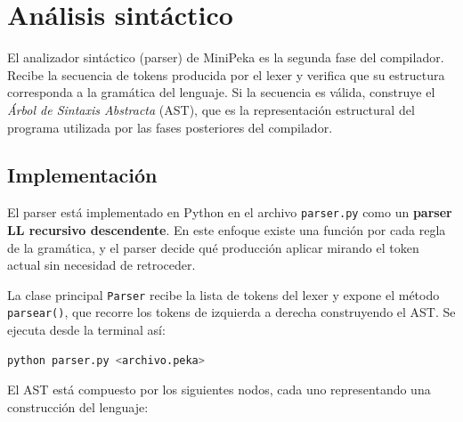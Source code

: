 \documentclass[12pt]{article}
\begin{document}
\section{Análisis sintáctico}

El analizador sintáctico (parser) de MiniPeka es la segunda fase del
compilador. Recibe la secuencia de tokens producida por el lexer y verifica
que su estructura corresponda a la gramática del lenguaje. Si la secuencia
es válida, construye el \textit{Árbol de Sintaxis Abstracta} (AST), que
es la representación estructural del programa utilizada por las fases
posteriores del compilador.

\subsection{Implementación}

El parser está implementado en Python en el archivo \texttt{parser.py}
como un \textbf{parser LL recursivo descendente}. En este enfoque existe
una función por cada regla de la gramática, y el parser decide qué
producción aplicar mirando el token actual sin necesidad de retroceder.

La clase principal \texttt{Parser} recibe la lista de tokens del lexer y
expone el método \texttt{parsear()}, que recorre los tokens de izquierda
a derecha construyendo el AST. Se ejecuta desde la terminal así:

\begin{lstlisting}[language=bash, caption={Uso del parser desde terminal}]
python parser.py <archivo.peka>
\end{lstlisting}

\noindent
El AST está compuesto por los siguientes nodos, cada uno representando
una construcción del lenguaje:
\end{document}
